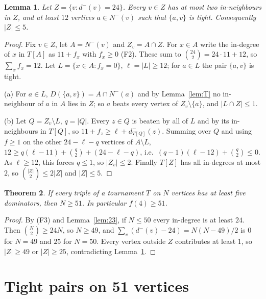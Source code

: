\documentclass[11pt]{amsart}
\newtheorem{theorem}{Theorem}[section]
\newtheorem{lemma}[theorem]{Lemma}
\theoremstyle{definition}
\theoremstyle{remark}
\newcommand{\D}{D}
\newcommand{\Nin}{N^{-}}
\newcommand{\din}{d^{-}}
\newcommand{\abs}[1]{\lvert #1\rvert}
\begin{document}
\begin{lemma}\label{lem:Q}
Let $Z=\{v:\din(v)=24\}$. Every $v\in Z$ has at most two in-neighbours in $Z$, and at least $12$ vertices $a\in\Nin(v)$ such that
$\{a,v\}$ is tight. Consequently $\abs Z\le5$.
\end{lemma}

\begin{proof}
Fix $v\in Z$, let $A=\Nin(v)$ and $Z_v=A\cap Z$. For $x\in A$ write the in-degree of $x$ in $T[A]$ as $11+f_x$ with $f_x\ge0$ (F2).
These sum to $\binom{24}2=24\cdot11+12$, so $\sum_xf_x=12$. Let $L=\{x\in A: f_x=0\}$, $\ell=\abs L\ge12$; for $a\in L$ the pair
$\{a,v\}$ is tight.

(a) For $a\in L$, $\D(\{a,v\})=A\cap\Nin(a)$ and by Lemma~\ref{lem:T} no in-neighbour of $a$ in $A$ lies in $Z$; so $a$ beats every
vertex of $Z_v\setminus\{a\}$, and $\abs{L\cap Z}\le1$.

(b) Let $Q=Z_v\setminus L$, $q=\abs Q$. Every $z\in Q$ is beaten by all of $L$ and by its in-neighbours in $T[Q]$, so
$11+f_z\ge\ell+d^-_{T[Q]}(z)$. Summing over $Q$ and using $f\ge1$ on the other $24-\ell-q$ vertices of $A\setminus L$,
$12\ge q(\ell-11)+\binom q2+(24-\ell-q)$, i.e.\ $(q-1)(\ell-12)+\binom q2\le0$. As $\ell\ge12$, this forces $q\le1$, so
$\abs{Z_v}\le2$. Finally $T[Z]$ has all in-degrees at most $2$, so $\binom{\abs Z}2\le2\abs Z$ and $\abs Z\le5$.
\end{proof}

\begin{theorem}\label{thm:51}
If every triple of a tournament $T$ on $N$ vertices has at least five dominators, then $N\ge51$. In particular $f(4)\ge51$.
\end{theorem}

\begin{proof}
By (F3) and Lemma~\ref{lem:23}, if $N\le50$ every in-degree is at least $24$. Then $\binom N2\ge24N$, so $N\ge49$, and
$\sum_v(\din(v)-24)=N(N-49)/2$ is $0$ for $N=49$ and $25$ for $N=50$. Every vertex outside $Z$ contributes at least $1$, so
$\abs Z\ge49$ or $\abs Z\ge25$, contradicting Lemma~\ref{lem:Q}.
\end{proof}

\section{Tight pairs on 51 vertices}\label{sec:J3}
\end{document}
